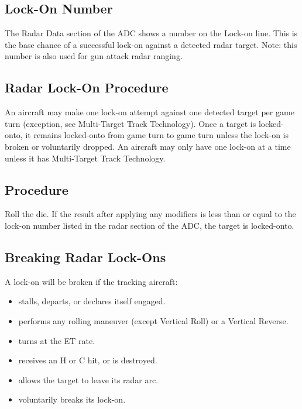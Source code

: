 \subsection{Lock-On Number} The Radar Data section of the ADC shows a number on the Lock-on line. This is the base chance of a successful lock-on against a detected radar target. Note: this number is also used for gun attack radar ranging.

\subsection{Radar Lock-On Procedure} An aircraft may make one lock-on attempt against one detected target per game turn (exception, see Multi-Target Track Technology). Once a target is locked-onto, it remains locked-onto from game turn to game turn unless the lock-on is broken or voluntarily dropped. An aircraft may only have one lock-on at a time unless it has Multi-Target Track Technology.

\subsection{Procedure} Roll the die. If the result after applying any modifiers is less than or equal to the lock-on number listed in the radar section of the ADC, the target is locked-onto. 

\subsection{Breaking Radar Lock-Ons} A lock-on will be broken if the tracking aircraft:

\begin{itemize}

    \item stalls, departs, or declares itself engaged.

    \item performs any rolling maneuver (except Vertical Roll) or a Vertical Reverse.

    \item turns at the ET rate.

    \item receives an H or C hit, or is destroyed.

    \item allows the target to leave its radar arc.

    \item voluntarily breaks its lock-on.

\end{itemize}

